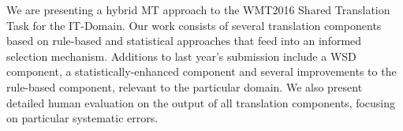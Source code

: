 We are presenting a hybrid MT approach to the WMT2016 Shared Translation Task for the IT-Domain. Our work consists of several translation components based on rule-based and statistical approaches that feed into an informed selection mechanism. Additions to last year's submission include a WSD component, a statistically-enhanced component and several improvements to the rule-based component, relevant to the particular domain. We also present detailed human evaluation on the output of all translation components, focusing on particular systematic errors.
